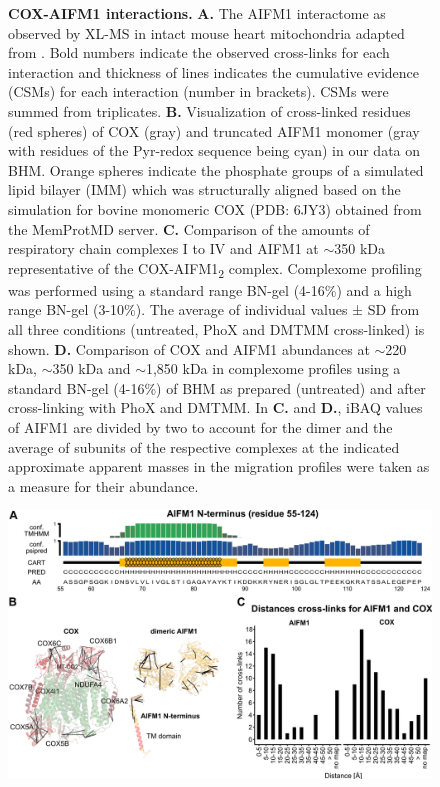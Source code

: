 \begin{subappendices}
\begin{figure}[htb]
        \caption{\textbf{COX-AIFM1 interactions.} \textbf{A.} The AIFM1 interactome as observed by XL-MS in intact mouse heart mitochondria adapted from \cite{RN16}. Bold numbers indicate the observed cross-links for each interaction and thickness of lines indicates the cumulative evidence (CSMs) for each interaction (number in brackets). CSMs were summed from triplicates. \textbf{B.} Visualization of cross-linked residues (red spheres) of COX (gray) and truncated AIFM1 monomer (gray with residues of the Pyr-redox sequence being cyan) in our data on BHM. Orange spheres indicate the phosphate groups of a simulated lipid bilayer (IMM) which was structurally aligned based on the simulation for bovine monomeric COX (PDB: 6JY3) obtained from the MemProtMD server. \textbf{C.} Comparison of the amounts of respiratory chain complexes I to IV and AIFM1 at $\sim$350 kDa representative of the COX-AIFM1\textsubscript{2} complex. Complexome profiling was performed using a standard range BN-gel (4-16\%) and a high range BN-gel (3-10\%). The average of individual values ± SD from all three conditions (untreated, PhoX and DMTMM cross-linked) is shown. \textbf{D.} Comparison of COX and AIFM1 abundances at $\sim$220 kDa, $\sim$350 kDa and $\sim$1,850 kDa in complexome profiles using a standard BN-gel (4-16\%) of BHM as prepared (untreated) and after cross-linking with PhoX and DMTMM. In \textbf{C.} and \textbf{D.}, iBAQ values of AIFM1 are divided by two to account for the dimer and the average of subunits of the respective complexes at the indicated approximate apparent masses in the migration profiles were taken as a measure for their abundance.}
        \label{fig:ch3_app_fig2}
    \end{figure}
    \begin{figure}[htb]
        \center
        \includegraphics[]{Chapter.3/Figures/SI_Figure3.png}

\end{figure}
\end{subappendices}
